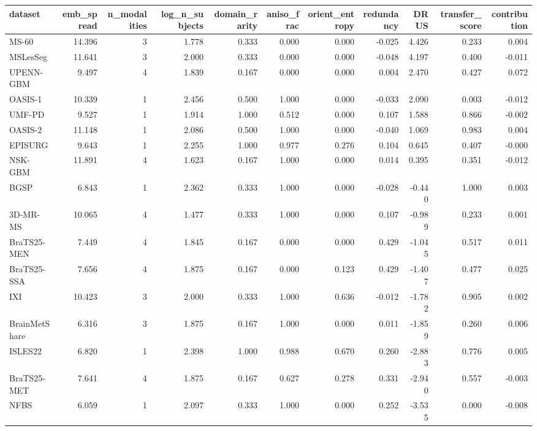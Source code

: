 \begin{tabular}{lrrrrrrrrrr}
\toprule
dataset & emb\_spread & n\_modalities & log\_n\_subjects & domain\_rarity & aniso\_frac & orient\_entropy & redundancy & DRUS & transfer\_score & contribution \\
\midrule
MS-60 & 14.396 & 3 & 1.778 & 0.333 & 0.000 & 0.000 & -0.025 & 4.426 & 0.233 & 0.004 \\
MSLesSeg & 11.641 & 3 & 2.000 & 0.333 & 0.000 & 0.000 & -0.048 & 4.197 & 0.400 & -0.011 \\
UPENN-GBM & 9.497 & 4 & 1.839 & 0.167 & 0.000 & 0.000 & 0.004 & 2.470 & 0.427 & 0.072 \\
OASIS-1 & 10.339 & 1 & 2.456 & 0.500 & 1.000 & 0.000 & -0.033 & 2.090 & 0.003 & -0.012 \\
UMF-PD & 9.527 & 1 & 1.914 & 1.000 & 0.512 & 0.000 & 0.107 & 1.588 & 0.866 & -0.002 \\
OASIS-2 & 11.148 & 1 & 2.086 & 0.500 & 1.000 & 0.000 & -0.040 & 1.069 & 0.983 & 0.004 \\
EPISURG & 9.643 & 1 & 2.255 & 1.000 & 0.977 & 0.276 & 0.104 & 0.645 & 0.407 & -0.000 \\
NSK-GBM & 11.891 & 4 & 1.623 & 0.167 & 1.000 & 0.000 & 0.014 & 0.395 & 0.351 & -0.012 \\
BGSP & 6.843 & 1 & 2.362 & 0.333 & 1.000 & 0.000 & -0.028 & -0.440 & 1.000 & 0.003 \\
3D-MR-MS & 10.065 & 4 & 1.477 & 0.333 & 1.000 & 0.000 & 0.107 & -0.989 & 0.233 & 0.001 \\
BraTS25-MEN & 7.449 & 4 & 1.845 & 0.167 & 0.000 & 0.000 & 0.429 & -1.045 & 0.517 & 0.011 \\
BraTS25-SSA & 7.656 & 4 & 1.875 & 0.167 & 0.000 & 0.123 & 0.429 & -1.407 & 0.477 & 0.025 \\
IXI & 10.423 & 3 & 2.000 & 0.333 & 1.000 & 0.636 & -0.012 & -1.782 & 0.905 & 0.002 \\
BrainMetShare & 6.316 & 3 & 1.875 & 0.167 & 1.000 & 0.000 & 0.011 & -1.859 & 0.260 & 0.006 \\
ISLES22 & 6.820 & 1 & 2.398 & 1.000 & 0.988 & 0.670 & 0.260 & -2.883 & 0.776 & 0.005 \\
BraTS25-MET & 7.641 & 4 & 1.875 & 0.167 & 0.627 & 0.278 & 0.331 & -2.940 & 0.557 & -0.003 \\
NFBS & 6.059 & 1 & 2.097 & 0.333 & 1.000 & 0.000 & 0.252 & -3.535 & 0.000 & -0.008 \\
\bottomrule
\end{tabular}
